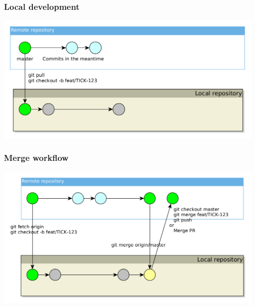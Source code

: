 \documentclass{beamer}
\begin{document}
    \begin{frame}
        \frametitle{Local development}
        \includegraphics[width=\textwidth]{images/git-commits/01-work-phase}
    \end{frame}


    \begin{frame}
        \frametitle{Merge workflow}
        \includegraphics[width=\textwidth]{images/git-commits/10-merge-workflow}
    \end{frame}
\end{document}
